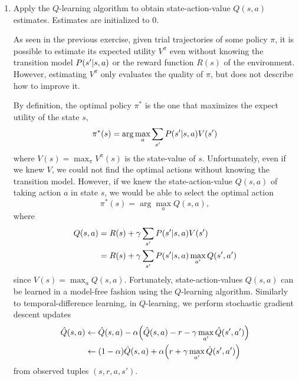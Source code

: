 \documentclass[11pt, a4paper]{article}
\begin{document}
\begin{enumerate}
    \item Apply the $Q$-learning algorithm to obtain state-action-value $Q(s, a)$ estimates. Estimates are initialized to $0$.
    
    \begin{solution}
        As seen in the previous exercise, given trial trajectories of some policy $\pi$, it is possible to estimate its expected utility $V^\pi$ even without knowing the transition model $P(s' \vert s, a)$ or the reward function $R(s)$ of the environment. However, estimating $V^\pi$ only evaluates the quality of $\pi$, but does not describe how to improve it.
        
        By definition, the optimal policy $\pi^*$ is the one that maximizes the expect utility of the state $s$, \ie{}
        \begin{equation*}
            \pi^*(s) = \arg \max_a \sum_{s'} P(s' \vert s, a) V(s')
        \end{equation*}
        where $V(s) = \max_\pi V^\pi(s)$ is the state-value of $s$. Unfortunately, even if we knew $V$, we could not find the optimal actions without knowing the transition model. However, if we knew the state-action-value $Q(s, a)$ of taking action $a$ in state $s$, we would be able to select the optimal action
        \begin{equation*}
            \pi^*(s) = \arg \max_a Q(s, a) ,
        \end{equation*}
        where
        \begin{align*}
            Q(s, a) & = R(s) + \gamma \sum_{s'} P(s' \vert s, a) V(s') \\
            & = R(s) + \gamma \sum_{s'} P(s' \vert s, a) \max_{a'} Q(s', a')
        \end{align*}
        since $V(s) = \max_a Q(s, a)$. Fortunately, state-action-values $Q(s, a)$ can be learned in a model-free fashion using the $Q$-learning algorithm. Similarly to temporal-difference learning, in $Q$-learning, we perform stochastic gradient descent updates
        \begin{align*}
            \hat{Q}(s, a) & \gets \hat{Q}(s, a) - \alpha \rbk*{\hat{Q}(s, a) - r - \gamma \max_{a'} \hat{Q}(s', a')} \\
            & \gets (1 - \alpha) \hat{Q}(s, a) + \alpha \rbk*{r + \gamma \max_{a'} \hat{Q}(s', a')}
        \end{align*}
        from observed tuples $(s, r, a, s')$.
        

\end{solution}
\end{enumerate}
\end{document}
